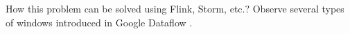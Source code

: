 
How this problem can be solved using Flink, Storm, etc.? Observe several types of windows introduced in Google Dataflow \cite{Akidau:2015:DMP:2824032.2824076}.